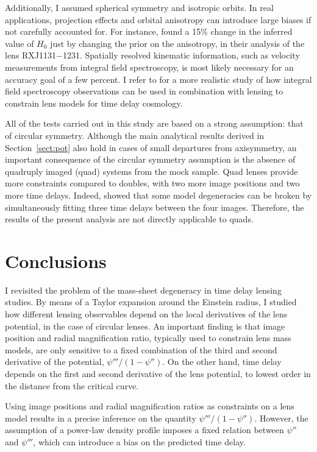 \documentclass[usenatbib]{mnras}
\def\psiii{\psi''}
\def\psiiii{\psi'''}
\def\Sref#1{Section~\ref{#1}\xspace}
\begin{document}
Additionally, I assumed spherical symmetry and isotropic orbits.
In real applications, projection effects and orbital anisotropy can introduce large biases if not carefully accounted for. For instance, \citet{Bir++16} found a 15\% change in the inferred value of $H_0$ just by changing the prior on the anisotropy, in their analysis of the lens RXJ1131$-$1231. 
Spatially resolved kinematic information, such as velocity measurements from integral field spectroscopy, is most likely necessary for an accuracy goal of a few percent.
I refer to \citet{STA17} for a more realistic study of how integral field spectroscopy observations can be used in combination with lensing to constrain lens models for time delay cosmology.

All of the tests carried out in this study are based on a strong assumption: that of circular symmetry.
Although the main analytical results derived in \Sref{sect:pot} also hold in cases of small departures from axisymmetry,
an important consequence of the circular symmetry assumption is the absence of quadruply imaged (quad) systems from the mock sample.
Quad lenses provide more constraints compared to doubles, with two more image positions and two more time delays.
Indeed, \citet{Suy++14} showed that some model degeneracies can be broken by simultaneously fitting three time delays between the four images. 
Therefore, the results of the present analysis are not directly applicable to quads.

\section{Conclusions}\label{sect:concl}

I revisited the problem of the mass-sheet degeneracy in time delay lensing studies.
By means of a Taylor expansion around the Einstein radius, I studied how different lensing observables depend on the local derivatives of the lens potential, in the case of circular lenses.
An important finding is that image position and radial magnification ratio, typically used to constrain lens mass models, are only sensitive to a fixed combination of the third and second derivative of the potential, $\psiiii/(1-\psiii)$.
On the other hand, time delay depends on the first and second derivative of the lens potential, to lowest order in the distance from the critical curve.

Using image positions and radial magnification ratios as constraints on a lens model results in a precise inference on the quantity $\psiiii/(1-\psiii)$.
However, the assumption of a power-law density profile imposes a fixed relation between $\psiii$ and $\psiiii$, which can introduce a bias on the predicted time delay.
\end{document}
